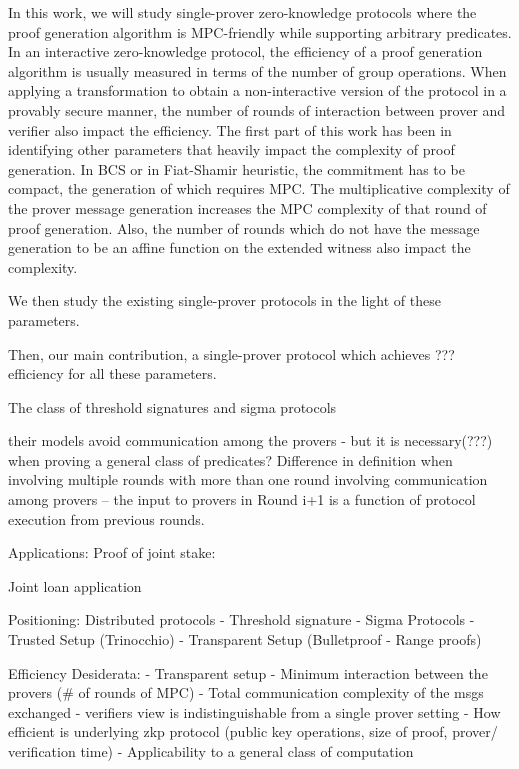 In this work, we will study single-prover zero-knowledge protocols where the proof generation algorithm is MPC-friendly while supporting arbitrary predicates. %
In an interactive zero-knowledge protocol, the efficiency of a proof generation algorithm is usually measured in terms of the number of group operations. When applying a transformation \cite{BCS16} to obtain a non-interactive version of the protocol in a provably secure manner, the number of rounds of interaction between prover and verifier also impact the efficiency. 
The first part of this work has been in identifying other parameters that heavily impact the complexity of proof generation. 
In BCS or in Fiat-Shamir heuristic, the commitment has to be compact, the generation of which requires MPC.
The multiplicative complexity of the prover message generation increases the MPC complexity of that round of proof generation.
Also, the number of rounds which do not have the message generation to be an affine function on the extended witness also impact the complexity.

We then study the existing single-prover protocols in the light of these parameters. 

Then, our main contribution, a single-prover protocol which achieves ??? efficiency for all these parameters.


The class of threshold signatures \cite{Ped} and sigma protocols \cite{KMR12}

their models avoid communication among the provers - but it is necessary(???) when proving a general class of predicates?
Difference in definition when involving multiple rounds with more than one round involving communication among provers -- the input to provers in Round i+1 is a function of protocol execution from previous rounds.


Applications: 
Proof of joint stake: 

Joint loan application


Positioning:  Distributed protocols
- Threshold signature
- Sigma Protocols
- Trusted Setup (Trinocchio)
- Transparent Setup (Bulletproof - Range proofs)

Efficiency Desiderata:  
- Transparent setup 
- Minimum interaction between the provers (\# of rounds of MPC) 
- Total communication complexity of the msgs exchanged
- verifiers view is indistinguishable from a single prover setting
- How efficient is underlying zkp protocol (public key operations, size of proof, prover/ verification time)
- Applicability to a general class of computation






